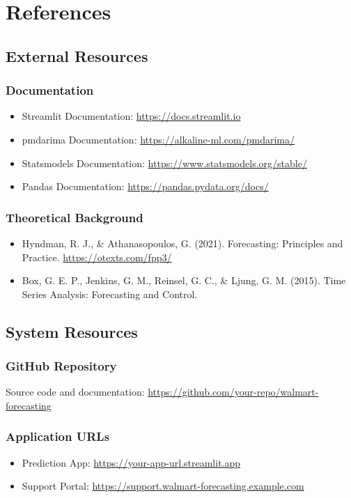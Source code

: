\chapter{References}

\section{External Resources}

\subsection{Documentation}
\begin{itemize}
	\item Streamlit Documentation: \url{https://docs.streamlit.io}
	\item pmdarima Documentation: \url{https://alkaline-ml.com/pmdarima/}
	\item Statsmodels Documentation: \url{https://www.statsmodels.org/stable/}
	\item Pandas Documentation: \url{https://pandas.pydata.org/docs/}
\end{itemize}

\subsection{Theoretical Background}
\begin{itemize}
	\item Hyndman, R. J., \& Athanasopoulos, G. (2021). Forecasting: Principles and Practice. \url{https://otexts.com/fpp3/}
	\item Box, G. E. P., Jenkins, G. M., Reinsel, G. C., \& Ljung, G. M. (2015). Time Series Analysis: Forecasting and Control.
\end{itemize}

\section{System Resources}

\subsection{GitHub Repository}
Source code and documentation: \url{https://github.com/your-repo/walmart-forecasting}

\subsection{Application URLs}
\begin{itemize}
	\item Prediction App: \url{https://your-app-url.streamlit.app}
	\item Support Portal: \url{https://support.walmart-forecasting.example.com}
\end{itemize}

